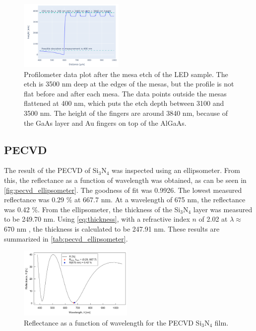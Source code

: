 \begin{figure}[ht]
    \centering
    \includegraphics[width=0.45\textwidth]{figures/LED_AlGaAs_3100nm_etch.png}
    \caption{
        Profilometer data plot after the mesa etch of the LED sample.
        The etch is 3500 nm deep at the edges of the mesas, but the profile is not flat before and after each mesa. 
        The data points outside the mesas flattened at 400 nm, which puts the etch depth between 3100 and 3500 nm.
        The height of the fingers are around 3840 nm, because of the GaAs layer and Au fingers on top of the AlGaAs.
    }
    \label{fig:profilometer_AlGaAs_3500nm_etch}
\end{figure}

\subsection{PECVD}

The result of the PECVD of Si$_3$N$_4$ was inspected using an ellipsometer.
From this, the reflectance as a function of wavelength was obtained, as can be seen in \autoref{fig:pecvd_ellipsometer}.
The goodness of fit was 0.9926.
The lowest measured reflectance was 0.29 \% at 667.7 nm. 
At a wavelength of 675 nm, the reflectance was 0.42 \%.
From the ellipsometer, the thickness of the Si$_3$N$_4$ layer was measured to be 249.70 nm.
Using \autoref{eq:thickness}, with a refractive index $n$ of 2.02 at $\lambda \approx$ 670 nm \cite{ref_index_Si3N4}, the thickness is calculated to be 247.91 nm. 
These results are summarized in \autoref{tab:pecvd_ellipsometer}.

\begin{figure}
    \centering
    \includegraphics[width=0.49\textwidth]{figures/PECVD_elips.png}
    \caption{Reflectance as a function of wavelength for the PECVD Si$_3$N$_4$ film.}
    \label{fig:pecvd_ellipsometer}
\end{figure}

